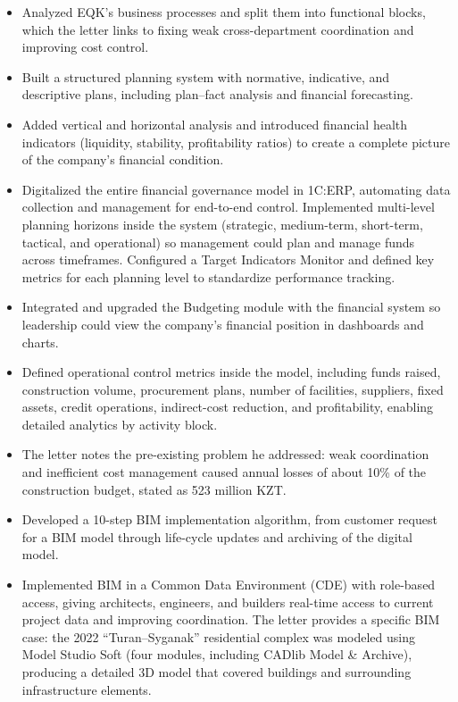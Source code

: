 \begin{itemize}[nosep]
\item Analyzed EQK’s business processes and split them into functional blocks, which the letter links to fixing weak cross-department coordination and improving cost control.
\item Built a structured planning system with normative, indicative, and descriptive plans, including plan–fact analysis and financial forecasting.
\item Added vertical and horizontal analysis and introduced financial health indicators (liquidity, stability, profitability ratios) to create a complete picture of the company’s financial condition.
\item Digitalized the entire financial governance model in 1C:ERP, automating data collection and management for end-to-end control. Implemented multi-level planning horizons inside the system (strategic, medium-term, short-term, tactical, and operational) so management could plan and manage funds across timeframes. Configured a Target Indicators Monitor and defined key metrics for each planning level to standardize performance tracking.
\item Integrated and upgraded the Budgeting module with the financial system so leadership could view the company’s financial position in dashboards and charts.
\item Defined operational control metrics inside the model, including funds raised, construction volume, procurement plans, number of facilities, suppliers, fixed assets, credit operations, indirect-cost reduction, and profitability, enabling detailed analytics by activity block.
\item The letter notes the pre-existing problem he addressed: weak coordination and inefficient cost management caused annual losses of about 10\% of the construction budget, stated as 523 million KZT.
\item Developed a 10-step BIM implementation algorithm, from customer request for a BIM model through life-cycle updates and archiving of the digital model.
\item Implemented BIM in a Common Data Environment (CDE) with role-based access, giving architects, engineers, and builders real-time access to current project data and improving coordination. The letter provides a specific BIM case: the 2022 “Turan–Syganak” residential complex was modeled using Model Studio Soft (four modules, including CADlib Model \& Archive), producing a detailed 3D model that covered buildings and surrounding infrastructure elements.
\end{itemize}

